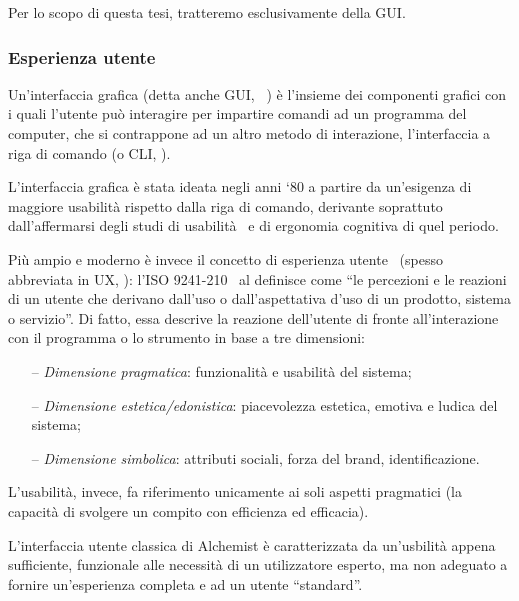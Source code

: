             Per lo scopo di questa tesi, tratteremo esclusivamente della GUI.

            \subsubsection{Esperienza utente}\label{subsub:prevUx}
                Un'interfaccia grafica (detta anche GUI, ~\cite{gui}) è l’insieme dei componenti grafici con i quali l'utente può interagire per impartire comandi ad un programma del computer, che si contrappone ad un altro metodo di interazione, l'interfaccia a riga di comando (o CLI, ).

                L'interfaccia grafica è stata ideata negli anni `80 a partire da un'esigenza di maggiore usabilità rispetto dalla riga di comando, derivante soprattuto dall'affermarsi degli studi di usabilità~\cite{norman1988} e di ergonomia cognitiva di quel periodo.

                Più ampio e moderno è invece il concetto di esperienza utente~\cite{ux} (spesso abbreviata in UX, ): l'ISO 9241-210~\cite{iso9421} al definisce come ``le percezioni e le reazioni di un utente che derivano dall’uso o dall’aspettativa d’uso di un prodotto, sistema o servizio''.
                Di fatto, essa descrive la reazione dell'utente di fronte all'interazione con il programma o lo strumento in base a tre dimensioni:
                \begin{itemize}
                    \item[--] \emph{Dimensione pragmatica}: funzionalità e usabilità del sistema;
                    \item[--] \emph{Dimensione estetica/edonistica}: piacevolezza estetica, emotiva e ludica del sistema;
                    \item[--] \emph{Dimensione simbolica}: attributi sociali, forza del brand, identificazione.
                \end{itemize}
                L'usabilità, invece, fa riferimento unicamente ai soli aspetti pragmatici (la capacità di svolgere un compito con efficienza ed efficacia).

                L'interfaccia utente classica di Alchemist è caratterizzata da un'usbilità appena sufficiente, funzionale alle necessità di un utilizzatore esperto, ma non adeguato a fornire un'esperienza completa e  ad un utente ``standard''.

